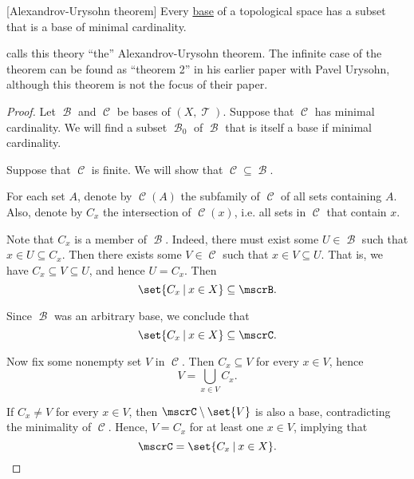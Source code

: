 \begin{theorem}\label{thm:base_has_subset_of_minimal_weight}[Alexandrov-Urysohn theorem]
  Every \hyperref[def:topological_base]{base} of a topological space has a subset that is a base of minimal cardinality.
\end{theorem}
\begin{comments}
  \item {} calls this theory \enquote{the} Alexandrov-Urysohn theorem. The infinite case of the theorem can be found as \enquote{theorem 2} in his earlier paper \cite{АлександровУрысон1950КомпактныеПространства} with Pavel Urysohn, although this theorem is not the focus of their paper.
\end{comments}
\begin{proof}
  Let \( \mscrB \) and \( \mscrC \) be bases of \( (X, \mscrT) \). Suppose that \( \mscrC \) has minimal cardinality. We will find a subset \( \mscrB_0 \) of \( \mscrB \) that is itself a base if minimal cardinality.

   Suppose that \( \mscrC \) is finite. We will show that \( \mscrC \subseteq \mscrB \).

  For each set \( A \), denote by \( \mscrC(A) \) the subfamily of \( \mscrC \) of all sets containing \( A \). Also, denote by \( C_x \) the intersection of \( \mscrC(x) \), i.e. all sets in \( \mscrC \) that contain \( x \).

  Note that \( C_x \) is a member of \( \mscrB \). Indeed, there must exist some \( U \in \mscrB \) such that \( x \in U \subseteq C_x \). Then there exists some \( V \in \mscrC \) such that \( x \in V \subseteq U \). That is, we have \( C_x \subseteq V \subseteq U \), and hence \( U = C_x \). Then
  \begin{equation*}
    \set{ C_x \given x \in X } \subseteq \mscrB.
  \end{equation*}

  Since \( \mscrB \) was an arbitrary base, we conclude that
  \begin{equation*}
    \set{ C_x \given x \in X } \subseteq \mscrC.
  \end{equation*}

  Now fix some nonempty set \( V \) in \( \mscrC \). Then \( C_x \subseteq V \) for every \( x \in V \), hence
  \begin{equation*}
    V = \bigcup_{x \in V} C_x.
  \end{equation*}

  If \( C_x \neq V \) for every \( x \in V \), then \( \mscrC \setminus \set{ V } \) is also a base, contradicting the minimality of \( \mscrC \). Hence, \( V = C_x \) for at least one \( x \in V \), implying that
  \begin{equation*}
    \mscrC = \set{ C_x \given x \in X }.
  \end{equation*}


\end{proof}
